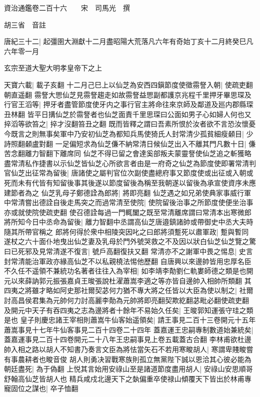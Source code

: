 資治通鑑卷二百十六　　宋　司馬光　撰

胡三省　音註

唐紀三十二|{
	起彊圉大淵獻十二月盡昭陽大荒落凡六年有奇始丁亥十二月終癸巳凡六年零一月}


玄宗至道大聖大明孝皇帝下之上

天寶六載|{
	載子亥翻}
十二月己巳上以仙芝為安西四鎭節度使徵霛詧入朝|{
	使疏吏翻朝直遥翻}
霛詧大愳仙芝見霛詧趨走如故霛詧益愳副都護京兆程千里押牙畢思琛及行官王滔等|{
	押牙者盡管節度使牙内之事行官主將命往來京師及鄰道及廵内郡縣琛丑林翻}
皆平日搆仙芝於霛詧者也仙芝面責千里思琛曰公面如男子心如婦人何也又捽滔等欲笞之|{
	捽才沒翻笞丑之翻}
既而皆釋之謂曰吾素所恨於汝者欲不言恐汝懷憂今既言之則無事矣軍中乃安初仙芝為都知兵馬使猗氏人封常清少孤貧細瘦顙目|{
	少詩照翻顙盧對翻}
一足偏短求為仙芝傔不納常清日候仙芝出入不離其門凡數十日|{
	傔苦念翻離力智翻下離席同}
仙芝不得已留之會達奚部叛夫蒙靈詧使仙芝追之斬獲略盡常清私作捷書以示仙芝皆仙芝心所欲言者由是一府奇之仙芝為節度使即署常清判官仙芝出征常為留後|{
	唐諸使之屬判官位次副使盡總府事又節度使或出征或入朝或死而未有代皆有知留後事其後遂以節度留後為稱至我朝遂以留後為承宣使資序未應建節者為之}
仙芝乳母子鄭德詮為郎將|{
	將即亮翻}
仙芝遇之如兄弟使典家事威行軍中常清嘗出德詮自後走馬突之而過常清至使院|{
	使院留後治事之所節度使便坐治事亦或就使院使疏吏翻}
使召德詮每過一門輒闔之既至常清離席謂曰常清本出寒微郎將所知今日中丞命為留後|{
	離力智翻中丞謂高仙芝唐邉鎮諸帥或帶御史中丞大夫時隨其所帶官稱之}
郎將何得於衆中相陵突因叱之曰郎將須蹔死以肅軍政|{
	蹔與暫同}
遂杖之六十面仆地曳出仙芝妻及乳母於門外號哭救之不及因以狀白仙芝仙芝覽之驚曰已死邪及見常清遂不復言|{
	號戶高翻復扶又翻}
常清亦不之謝軍中畏之惕息|{
	史言封常清能治軍政亦緣高仙芝不以私親橈法惕他歷翻}
自唐興以來邊帥皆用忠厚名臣不久任不遥領不兼統功名著者往往入為宰相|{
	如李靖李勣劉仁軌婁師德之類是也開元以來薛訥郭元振張嘉貞王晙張說杜濯蕭嵩李適之等亦皆自邊帥入相帥所類翻}
其四夷之將雖才略如阿史那社爾契苾何力猶不專大將之任皆以大臣為使以制之|{
	社爾討高昌侯君集為元帥何力討高麗李勣為元帥將即亮翻契欺紇翻苾毗必翻使疏吏翻}
及開元中天子有吞四夷之志為邊將者十餘年不易始久任矣|{
	王晙郭知運張守珪之類是也}
皇子則慶忠諸王宰相則蕭嵩牛仙客始遥領矣|{
	請王事見二百十三卷開元十五年蕭嵩事見十七年牛仙客事見二百十四卷二十四年}
蓋嘉運王忠嗣專制數道始兼統矣|{
	蓋嘉運事見二百十四卷開元二十八年王忠嗣事見上卷五載蓋古合翻}
李林甫欲杜邊帥入相之路以胡人不知書乃奏言文臣為將怯當矢石不若用寒畯胡人|{
	寒謂卑賤畯嘗有事農耕者也畯音俊}
胡人則勇决習戰寒族則孤立無黨陛下誠以恩洽其心彼必能為朝廷盡死|{
	為于偽翻}
上悦其言始用安祿山至是諸道節度盡用胡人|{
	安祿山安思順哥舒翰高仙芝皆胡人也}
精兵咸戍北邊天下之埶偏重卒使禄山傾覆天下皆出於林甫專寵固位之謀也|{
	卒子恤翻}


